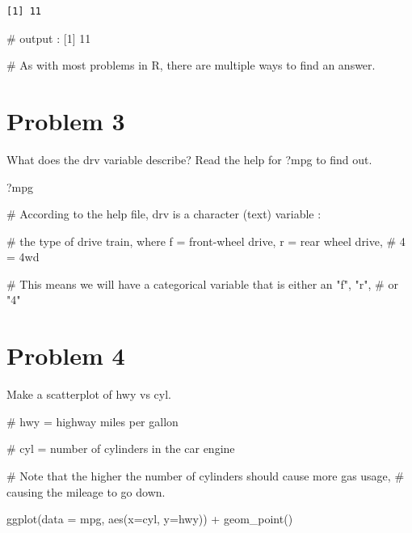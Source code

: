 \documentclass[
  letterpaper,
  DIV=11,
  numbers=noendperiod]{scrreprt}
\newenvironment{Shaded}{\begin{snugshade}}{\end{snugshade}}
\newcommand{\AttributeTok}[1]{\textcolor[rgb]{0.40,0.45,0.13}{#1}}
\newcommand{\CommentTok}[1]{\textcolor[rgb]{0.37,0.37,0.37}{#1}}
\newcommand{\FunctionTok}[1]{\textcolor[rgb]{0.28,0.35,0.67}{#1}}
\newcommand{\NormalTok}[1]{\textcolor[rgb]{0.00,0.23,0.31}{#1}}
\newcommand{\SpecialCharTok}[1]{\textcolor[rgb]{0.37,0.37,0.37}{#1}}
\begin{document}
\begin{verbatim}
[1] 11
\end{verbatim}

\begin{Shaded}
\begin{Highlighting}[]
\CommentTok{\# output : [1] 11}

\CommentTok{\# As with most problems in R, there are multiple ways to find an answer.}
\end{Highlighting}
\end{Shaded}

\section*{Problem 3}\label{problem-3-3}


What does the drv variable describe? Read the help for ?mpg to find out.

\begin{Shaded}
\begin{Highlighting}[]
\NormalTok{?mpg}

\CommentTok{\# According to the help file, drv is a character (text) variable : }

\CommentTok{\# the type of drive train, where f = front{-}wheel drive, r = rear wheel drive, }
\CommentTok{\# 4 = 4wd}

\CommentTok{\# This means we will have a categorical variable that is either an "f", "r",}
\CommentTok{\# or "4"}
\end{Highlighting}
\end{Shaded}

\section*{Problem 4}\label{problem-4-3}


Make a scatterplot of hwy vs cyl.

\begin{Shaded}
\begin{Highlighting}[]
\CommentTok{\# hwy = highway miles per gallon}

\CommentTok{\# cyl = number of cylinders in the car engine }

\CommentTok{\# Note that the higher the number of cylinders should cause more gas usage,}
\CommentTok{\# causing the mileage to go down.}

\FunctionTok{ggplot}\NormalTok{(}\AttributeTok{data =}\NormalTok{ mpg, }\FunctionTok{aes}\NormalTok{(}\AttributeTok{x=}\NormalTok{cyl, }\AttributeTok{y=}\NormalTok{hwy)) }\SpecialCharTok{+}
  \FunctionTok{geom\_point}\NormalTok{()}
\end{Highlighting}
\end{Shaded}
\end{document}
